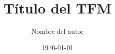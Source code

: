 \documentclass[11pt]{report}
\begin{document}
\title{Título del TFM}
\author{Nombre del autor}
\date{\today}

\maketitle

\tableofcontents

%
%
%
%
%
%

\appendix



\end{document}
